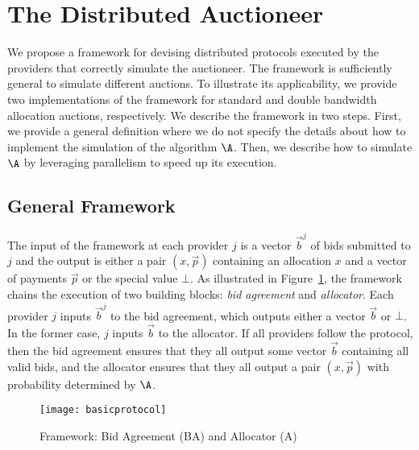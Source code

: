 
\section{The Distributed Auctioneer}
\label{sec__dist_auctioneer_design}

We propose a framework for devising distributed 
protocols executed by the providers that correctly simulate the auctioneer.
The framework is sufficiently general to simulate different auctions.
To illustrate its applicability, we provide two implementations 
of the framework for standard and double 
bandwidth allocation auctions, respectively.
We describe the framework in two steps. First, we provide a general definition
where we do not specify the details about how to implement the simulation
of the algorithm $\A$. Then, we describe how to simulate $\A$
by leveraging parallelism to speed up its execution.


\subsection{General Framework}
The input of the framework at each provider $j$ is a vector $\vec{b}^j$
of bids submitted to $j$ and the output is either a pair $(x,\vec{p})$ containing
an allocation $x$ and a vector of payments $\vec{p}$ or the special value $\bot$.
As illustrated in Figure~\ref{fig:framework}, the framework chains the execution
of two building blocks: \emph{bid agreement} and \emph{allocator}.
Each provider $j$ inputs $\vec{b}^j$ to the bid agreement,
which outputs either a vector $\vec{b}$ or $\bot$.
In the former case, $j$ inputs $\vec{b}$ to the allocator.
If all providers follow the protocol, then the bid agreement ensures
that they all output some vector $\vec{b}$ containing all valid bids,
and the allocator ensures that they all output a pair $(x,\vec{p})$
with probability determined by $\A$.

\begin{figure}[tbp]
	\centering
	\texttt{[image: basicprotocol]}
	\caption{Framework: Bid Agreement (BA) and Allocator (A)}
	\label{fig:framework}
\end{figure}

